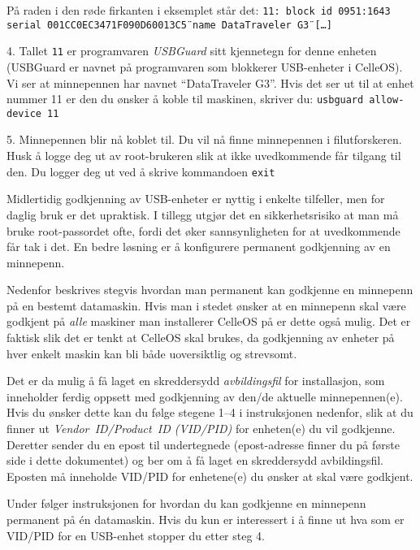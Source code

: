 \item{} P\aa{} raden i den r\o de firkanten i eksemplet st\aa r det:
\smallskip
{\tt 11: block id 0951:1643 serial \"{}001CC0EC3471F090D60013C5\"{} name \"{}DataTraveler G3\"{}{} [\dots]}
\medskip
\item{4. } Tallet {\tt 11} er programvaren {\it USBGuard} sitt kjennetegn for denne enheten (USBGuard er navnet p\aa{} programvaren som blokkerer USB-enheter i CelleOS). Vi ser at minnepennen har navnet ``DataTraveler G3''. Hvis det ser ut til at enhet nummer 11 er den du \o nsker \aa{} koble til maskinen, skriver du:
\medskip
{\tt usbguard allow-device 11}
\medskip
\item{5.} Minnepennen blir n\aa{} koblet til. Du vil n\aa{} finne minnepennen i filutforskeren. Husk \aa{} logge deg ut av root-brukeren slik at ikke uvedkommende f\aa r tilgang til den. Du logger deg ut ved \aa{} skrive kommandoen
\medskip
{\tt exit}
\medskip


Midlertidig godkjenning av USB-enheter er nyttig i enkelte tilfeller, men for daglig bruk er det upraktisk. I tillegg utgj\o r det en sikkerhetsrisiko at man m\aa{} bruke root-passordet ofte, fordi det \o ker sannsynligheten for at uvedkommende f\aa r tak i det. En bedre l\o sning er \aa{} konfigurere permanent godkjenning av en minnepenn.

Nedenfor beskrives stegvis hvordan man permanent kan godkjenne en minnepenn p\aa{} en bestemt datamaskin. Hvis man i stedet \o nsker at en minnepenn skal v\ae re godkjent p\aa{} {\it alle} maskiner man installerer CelleOS p\aa{} er dette ogs\aa{} mulig. Det er faktisk slik det er tenkt at CelleOS skal brukes, da godkjenning av enheter p\aa{} hver enkelt maskin kan bli b\aa de uoversiktlig og strevsomt.

Det er da mulig \aa{} f\aa{} laget en skreddersydd {\it avbildingsfil} for installasjon, som inneholder ferdig oppsett med godkjenning av den/de aktuelle minnepennen(e). Hvis du \o nsker dette kan du f\o lge stegene 1--4 i instruksjonen nedenfor, slik at du finner ut {\it Vendor~ID/Product~ID (VID/PID)\/} for enheten(e) du vil godkjenne. Deretter sender du en epost til undertegnede (epost-adresse finner du p\aa{} f\o rste side i dette dokumentet) og ber om \aa{} f\aa{} laget en skreddersydd avbildingsfil. Eposten m\aa{} inneholde VID/PID for enhetene(e) du \o nsker at skal v\ae re godkjent. 

Under f\o lger instruksjonen for hvordan du kan godkjenne en minnepenn permanent p\aa{} \'en datamaskin. Hvis du kun er interessert i \aa{} finne ut hva som er VID/PID for en USB-enhet stopper du etter steg 4.

